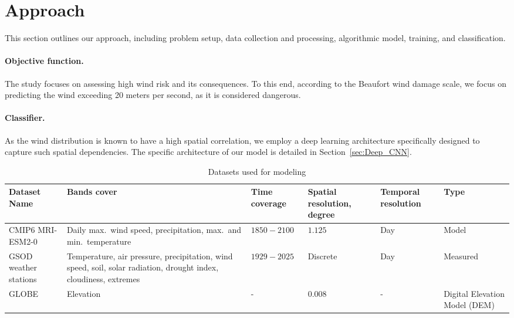 \documentclass{article}
\begin{document}
\section{Approach}
\label{sec:methodology}

This section outlines our approach, including problem setup, data collection and processing, algorithmic model, training, and classification.

\paragraph {Objective function.} The study focuses on assessing high wind risk and its consequences. To this end, according to the Beaufort wind damage scale, we focus on predicting the wind exceeding 20 meters per second, as it is considered dangerous. 

\paragraph {Classifier.} As the wind distribution is known to have a high spatial correlation, we employ a deep learning architecture specifically designed to capture such spatial dependencies. The specific architecture of our model is detailed in Section~\ref{sec:Deep_CNN}.

\begin{table}[t]
    \centering
    \begin{tabular}{p{3cm}|p{4.7cm}|R{2.1cm}|R{2cm}|p{1.7cm}|p{1.6cm}} %
        \toprule
        Dataset Name & Bands cover & Time coverage & Spatial resolution, degree & Temporal resolution & Type  \\
        \midrule
        CMIP6 MRI-ESM2-0 \cite{SeijiYukimoto20122012-A02} & Daily max.\ wind speed, precipitation, max.\ and min.\ temperature & $1850 - 2100$ & $1.125$ &  Day & Model \\
        \midrule
        GSOD weather stations \cite{gsod23}&  Temperature, air pressure, precipitation, wind speed, soil, solar radiation, drought index, cloudiness, extremes & $1929 - 2025$ & Discrete &  Day & Measured\\
        \midrule
        GLOBE \cite{hastings1998development} &  Elevation & - & $0.008$ &  - & 
        Digital Elevation Model (DEM) \\
        \bottomrule
    \end{tabular}
    \caption{Datasets used for modeling%
    }
    \label{tab:datasets}
\end{table}
\end{document}
